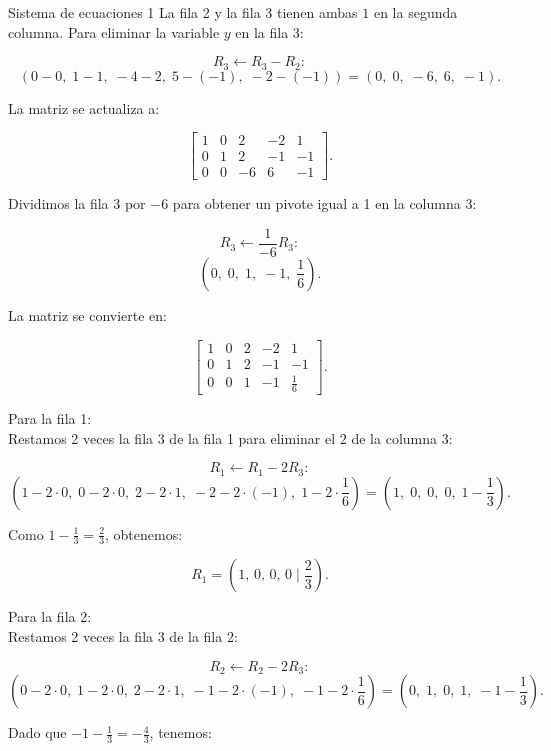 \documentclass[11pt,letterpaper]{article}
\begin{document}
\begin{inciso}{Sistema de ecuaciones 1}
    La fila 2 y la fila 3 tienen ambas \(1\) en la segunda columna. Para eliminar la variable \(y\) en la fila 3:
    
    \[
    R_3 \leftarrow R_3 - R_2:
    \]
    \[
    (0-0,\; 1-1,\; -4-2,\; 5-(-1),\; -2-(-1)) = (0,\; 0,\; -6,\; 6,\; -1).
    \]
    
    La matriz se actualiza a:
    
    \[
    \left[\begin{array}{cccc|c}
    1 & 0 & 2 & -2 & 1 \\
    0 & 1 & 2 & -1 & -1 \\
    0 & 0 & -6 & 6 & -1
    \end{array}\right].
    \]
        
    Dividimos la fila 3 por \(-6\) para obtener un pivote igual a 1 en la columna 3:
    
    \[
    R_3 \leftarrow \frac{1}{-6}R_3:
    \]
    \[
    (0,\; 0,\; 1,\; -1,\; \frac{1}{6}).
    \]
    
    La matriz se convierte en:
    
    \[
    \left[\begin{array}{cccc|c}
    1 & 0 & 2 & -2 & 1 \\
    0 & 1 & 2 & -1 & -1 \\
    0 & 0 & 1 & -1 & \frac{1}{6}
    \end{array}\right].
    \]
    
    
    Para la fila 1:\\
      Restamos 2 veces la fila 3 de la fila 1 para eliminar el \(2\) de la columna 3:
    
      \[
      R_1 \leftarrow R_1 - 2R_3:
      \]
      \[
      (1-2\cdot0,\; 0-2\cdot0,\; 2-2\cdot1,\; -2-2\cdot(-1),\; 1-2\cdot\frac{1}{6}) = (1,\; 0,\; 0,\; 0,\; 1-\frac{1}{3}).
      \]
      
      Como \(1 - \frac{1}{3} = \frac{2}{3}\), obtenemos:
      
      \[
      R_1 = (1,\,0,\,0,\,0 \;|\; \frac{2}{3}).
      \]
    
    Para la fila 2:\\
      Restamos 2 veces la fila 3 de la fila 2:
    
      \[
      R_2 \leftarrow R_2 - 2R_3:
      \]
      \[
      (0-2\cdot0,\; 1-2\cdot0,\; 2-2\cdot1,\; -1-2\cdot(-1),\; -1-2\cdot\frac{1}{6}) = (0,\; 1,\; 0,\; 1,\; -1-\frac{1}{3}).
      \]
      
      Dado que \(-1-\frac{1}{3} = -\frac{4}{3}\), tenemos:
      

\end{inciso}
\end{document}
